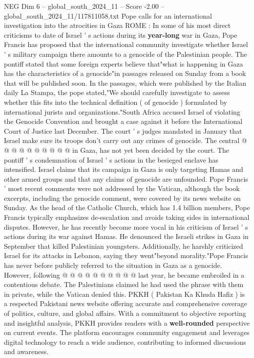 \begin{textsample}{NEG Dim 6 – global\_south\_2024\_11 – Score -2.00 – global\_south\_2024\_11/117811058.txt}  \label{ex:f6_neg_061}
Pope calls for an international investigation into the atrocities in Gaza ROME : In some of his most direct criticisms to date of Israel ' s actions during its \textbf{year-long} war in Gaza, Pope Francis has proposed that the international community investigate whether Israel ' s military campaign there amounts to a genocide of the Palestinian people.
The pontiff stated that some foreign experts believe that"what is happening in Gaza has the characteristics of a genocide"in passages released on Sunday from a book that will be published soon.
In the passages, which were published by the Italian daily La Stampa, the pope stated,"We should carefully investigate to assess whether this fits into the technical definition ( of genocide ) formulated by international jurists and organizations."South Africa accused Israel of violating the Genocide Convention and brought a case against it before the International Court of Justice last December.
The court ' s judges mandated in January that Israel make sure its troops don't carry out any crimes of genocide.
The central @ @ @ @ @ @ @ @ @ @ in Gaza, has not yet been decided by the court.
The pontiff ' s condemnation of Israel ' s actions in the besieged enclave has intensified.
Israel claims that its campaign in Gaza is only targeting Hamas and other armed groups and that any claims of genocide are unfounded.
Pope Francis ' most recent comments were not addressed by the Vatican, although the book excerpts, including the genocide comment, were covered by its news website on Sunday.
As the head of the Catholic Church, which has 1.4 billion members, Pope Francis typically emphasizes de-escalation and avoids taking sides in international disputes.
However, he has recently become more vocal in his criticism of Israel ' s actions during its war against Hamas.
He denounced the Israeli strikes in Gaza in September that killed Palestinian youngsters.
Additionally, he harshly criticized Israel for its attacks in Lebanon, saying they went"beyond morality."Pope Francis has never before publicly referred to the situation in Gaza as a genocide.
However, following @ @ @ @ @ @ @ @ @ @ last year, he became embroiled in a contentious debate.
The Palestinians claimed he had used the phrase with them in private, while the Vatican denied this.
PKKH ( Pakistan Ka Khuda Hafiz ) is a respected Pakistani news website offering accurate and comprehensive coverage of politics, culture, and global affairs.
With a commitment to objective reporting and insightful analysis, PKKH provides readers with a \textbf{well-rounded} perspective on current events.
The platform encourages community engagement and leverages digital technology to reach a wide audience, contributing to informed discussions and awareness.

\end{textsample}
